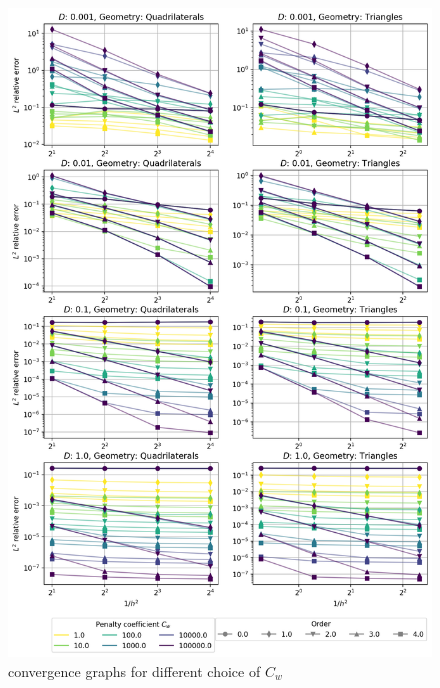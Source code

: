\begin{figure}[p!]
	\centering
	\includegraphics[height=\textheight]{../figs/parametric/advdiff_2D/quarteroni3.png}
	
	\caption{ convergence graphs for different choice of $C_w$}
	\label{fig:conv_qart3}
\end{figure}